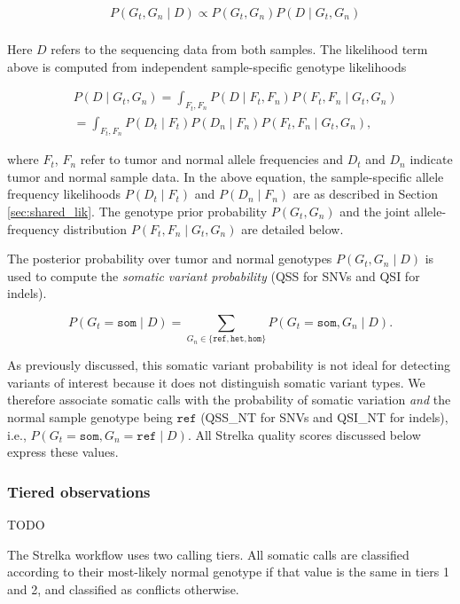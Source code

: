 \documentclass{article}
\begin{document}
\begin{align*}
	& P(G_t,G_n \mid D) \propto P(G_t,G_n) P(D \mid G_t,G_n) \\
\end{align*}


Here $D$ refers to the sequencing data from both samples. The likelihood term above is computed from independent sample-specific genotype likelihoods

\begin{align*}
	& P(D \mid G_t,G_n) = \int_{F_t,F_n}{P(D \mid F_t,F_n)P(F_t,F_n \mid G_t,G_n)} \\
	& = \int_{F_t,F_n}{P(D_t \mid F_t)P(D_n \mid F_n)P(F_t,F_n \mid G_t,G_n)},
\end{align*}

\noindent where $F_t$, $F_n$ refer to tumor and normal allele frequencies and $D_t$ and $D_n$ indicate tumor and normal sample data. In the above equation, the sample-specific allele frequency likelihoods $P(D_t \mid F_t)$ and $P(D_n \mid F_n)$ are as described in Section \ref{sec:shared_lik}. The genotype prior probability $P(G_t, G_n)$ and the joint allele-frequency distribution $P(F_t,F_n \mid G_t,G_n)$ are detailed below.

The posterior probability over tumor and normal genotypes $P(G_t,G_n \mid D)$ is used to compute the {\em somatic variant probability} (QSS for SNVs and QSI for indels).

\begin{equation}
\label{eqn:somVarProb}
	P(G_t = \texttt{som} \mid D) = \sum_{G_n \in \{ \texttt{ref}, \texttt{het}, \texttt{hom} \}}{P(G_t=\texttt{som},G_n \mid D)}.
\end{equation}

As previously discussed, this somatic variant probability is not ideal for detecting variants of interest because it does not distinguish somatic variant types. We therefore associate somatic calls with the probability of somatic variation {\em and} the normal sample genotype being $\texttt{ref}$ (QSS\_NT for SNVs and QSI\_NT for indels), i.e., $P(G_t = \texttt{som}, G_n = \texttt{ref} \mid D)$. All Strelka quality scores discussed below express these values.


\subsubsection{Tiered observations}
\label{sec:somatic_tiers}

TODO

The Strelka workflow uses two calling tiers. All somatic calls are classified according to their most-likely normal genotype if that value is the same in tiers 1 and 2, and classified as conflicts otherwise.
\end{document}
